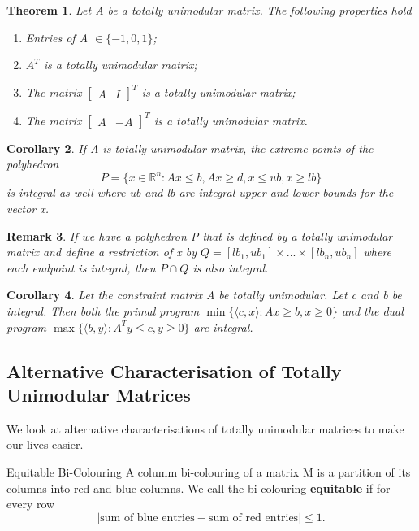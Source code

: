 \documentclass[twoside]{article}
\newcounter{lecnum}
\newtheorem{theorem}{Theorem}[lecnum]
\newtheorem{corollary}[theorem]{Corollary}
\newtheorem{remark}[theorem]{Remark}
\begin{document}
\begin{theorem}Let A be a totally unimodular matrix. The following properties hold 
\begin{enumerate}
\item Entries of A $\in \{-1, 0, 1\}$;
\item $A^T$ is a totally unimodular matrix;
\item The matrix $\begin{bmatrix}A & I \end{bmatrix}^T$ is a totally unimodular matrix;
\item The matrix $\begin{bmatrix}A & -A \end{bmatrix}^T$ is a totally unimodular matrix.
\end{enumerate}
\end{theorem}

\begin{corollary}If A is totally unimodular matrix, the extreme points of the polyhedron 
$$
P = \{x \in \mathbb{R}^n: Ax \leq b, Ax \geq d, x \leq ub, x \geq lb\}
$$
is integral as well where ub and lb are integral upper and lower bounds for the vector x.
\end{corollary}

\begin{remark}If we have a polyhedron P that is defined by a totally unimodular matrix and define a restriction of x by $Q = [lb_1,ub_1] \times ... \times [lb_n,ub_n]$ where each endpoint is integral, then $P \cap Q$ is also integral.
\end{remark}

\begin{corollary}Let the constraint matrix A be totally unimodular. Let c and b be integral. Then both the primal program $\min \{\langle c, x \rangle: Ax \geq b, x \geq 0\}$ and the dual program $\max \{\langle b, y \rangle: A^Ty \leq c, y \geq 0\}$ are integral.
\end{corollary}

\subsection{Alternative Characterisation of Totally Unimodular Matrices}
We look at alternative characterisations of totally unimodular matrices to make our lives easier.
\begin{definition_exam}{Equitable Bi-Colouring}{} A columm bi-colouring of a matrix M is a partition of its columns into red and blue columns. We call the bi-colouring \textbf{equitable} if for every row 
$$
|\text{sum of blue entries} - \text{sum of red entries}| \leq 1.
$$
\end{definition_exam}
\end{document}
